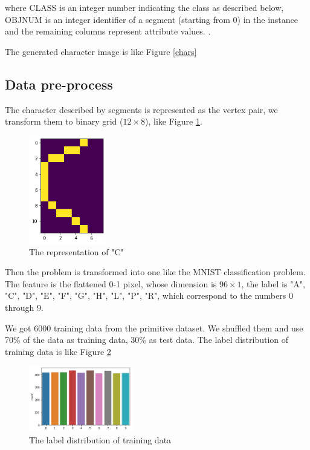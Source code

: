 \documentclass[11pt,en,cite=authoryear]{elegantpaper}
\begin{document}
where CLASS is an integer number indicating the class as described below, OBJNUM is an integer identifier of a segment (starting from 0) in the instance and the remaining columns represent attribute values. \cite{schapire1999improved}.

The generated character image is like Figure \ref{chars}


\subsection{Data pre-process}
The character described by segments is represented as the vertex pair, we transform them to binary grid ($12\times 8$), like Figure \ref{transform}.

\begin{figure}[h]
	\centering
	\includegraphics[width=0.3\textwidth]{image/C_array}
	\caption{The representation of "C"}
	\label{transform}
\end{figure}

Then the problem is transformed into one like the MNIST classification problem. The feature is the flattened 0-1 pixel, whose dimension is $96\times 1$, the label is "A", "C", "D", "E", "F", 
"G", "H", "L", "P", "R", which correspond to the numbers 0 through 9. 


We got 6000 training data from the primitive dataset. We shuffled them and use 70\% of the data as training data, 30\% as test data. The label distribution of training data is like Figure \ref{dist_y}

\begin{figure}[h]
	\centering
	\includegraphics[width=0.4\textwidth]{image/dis_y}
	\caption{The label distribution of training data}
	\label{dist_y}
\end{figure}
\end{document}

